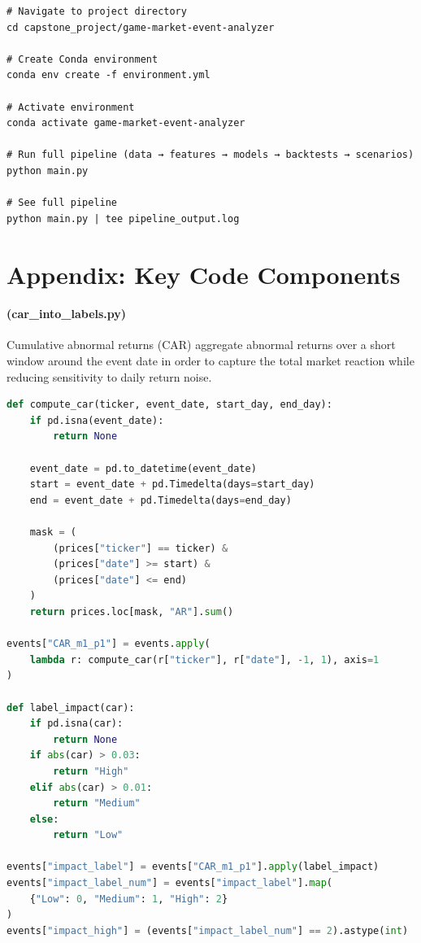 \documentclass[11pt,a4paper]{article}
\begin{document}
\begin{verbatim}
# Navigate to project directory
cd capstone_project/game-market-event-analyzer

# Create Conda environment
conda env create -f environment.yml

# Activate environment
conda activate game-market-event-analyzer

# Run full pipeline (data → features → models → backtests → scenarios)
python main.py 

# See full pipeline
python main.py | tee pipeline_output.log
\end{verbatim}


\section{Appendix: Key Code Components}

\paragraph{(car\_into\_labels.py)}
Cumulative abnormal returns (CAR) aggregate abnormal returns over a short window around the event date in order to capture the total market reaction while reducing sensitivity to daily return noise.

\begin{lstlisting}[language=Python, caption={Construction of CAR-based impact labels}]
def compute_car(ticker, event_date, start_day, end_day):
    if pd.isna(event_date):
        return None

    event_date = pd.to_datetime(event_date)
    start = event_date + pd.Timedelta(days=start_day)
    end = event_date + pd.Timedelta(days=end_day)

    mask = (
        (prices["ticker"] == ticker) &
        (prices["date"] >= start) &
        (prices["date"] <= end)
    )
    return prices.loc[mask, "AR"].sum()

events["CAR_m1_p1"] = events.apply(
    lambda r: compute_car(r["ticker"], r["date"], -1, 1), axis=1
)

def label_impact(car):
    if pd.isna(car):
        return None
    if abs(car) > 0.03:
        return "High"
    elif abs(car) > 0.01:
        return "Medium"
    else:
        return "Low"

events["impact_label"] = events["CAR_m1_p1"].apply(label_impact)
events["impact_label_num"] = events["impact_label"].map(
    {"Low": 0, "Medium": 1, "High": 2}
)
events["impact_high"] = (events["impact_label_num"] == 2).astype(int)
\end{lstlisting}
\end{document}

